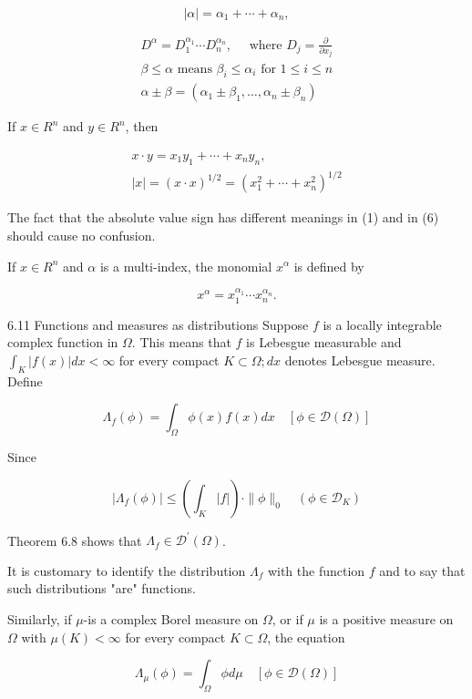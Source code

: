 \documentclass[10pt]{article}
\begin{document}
$$
|\alpha|=\alpha_{1}+\cdots+\alpha_{n},
$$

$$
\begin{gathered}
D^{\alpha}=D_{1}^{\alpha_{1}} \cdots D_{n}^{\alpha_{n}}, \quad \text { where } D_{j}=\frac{\partial}{\partial x_{j}} \\
\beta \leq \alpha \text { means } \beta_{i} \leq \alpha_{i} \text { for } 1 \leq i \leq n \\
\alpha \pm \beta=\left(\alpha_{1} \pm \beta_{1}, \ldots, \alpha_{n} \pm \beta_{n}\right)
\end{gathered}
$$

If $x \in R^{n}$ and $y \in R^{n}$, then

$$
\begin{gathered}
x \cdot y=x_{1} y_{1}+\cdots+x_{n} y_{n}, \\
|x|=(x \cdot x)^{1 / 2}=\left(x_{1}^{2}+\cdots+x_{n}^{2}\right)^{1 / 2}
\end{gathered}
$$

The fact that the absolute value sign has different meanings in (1) and in (6) should cause no confusion.

If $x \in R^{n}$ and $\alpha$ is a multi-index, the monomial $x^{\alpha}$ is defined by

$$
x^{\alpha}=x_{1}^{\alpha_{1}} \cdots x_{n}^{\alpha_{n}} .
$$

6.11 Functions and measures as distributions Suppose $f$ is a locally integrable complex function in $\Omega$. This means that $f$ is Lebesgue measurable and $\int_{K}|f(x)| d x<\infty$ for every compact $K \subset \Omega ; d x$ denotes Lebesgue measure. Define

$$
\Lambda_{f}(\phi)=\int_{\Omega} \phi(x) f(x) d x \quad[\phi \in \mathscr{D}(\Omega)]
$$

Since

$$
\left|\Lambda_{f}(\phi)\right| \leq\left(\int_{K}|f|\right) \cdot\|\phi\|_{0} \quad\left(\phi \in \mathscr{D}_{K}\right)
$$

Theorem 6.8 shows that $\Lambda_{f} \in \mathscr{D}^{\prime}(\Omega)$.

It is customary to identify the distribution $\Lambda_{f}$ with the function $f$ and to say that such distributions "are" functions.

Similarly, if $\mu$-is a complex Borel measure on $\Omega$, or if $\mu$ is a positive measure on $\Omega$ with $\mu(K)<\infty$ for every compact $K \subset \Omega$, the equation

$$
\Lambda_{\mu}(\phi)=\int_{\Omega} \phi d \mu \quad[\phi \in \mathscr{D}(\Omega)]
$$
\end{document}
